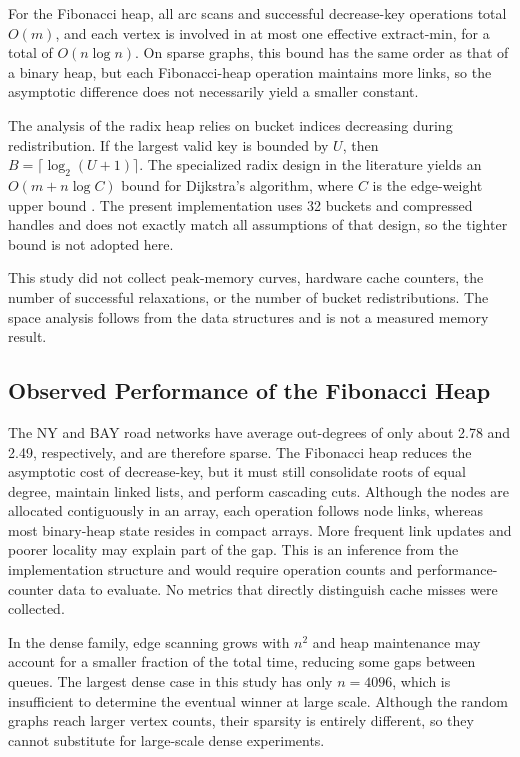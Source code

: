 For the Fibonacci heap, all arc scans and successful decrease-key operations total
$O(m)$, and each vertex is involved in at most one effective extract-min, for a
total of $O(n\log n)$. On sparse graphs, this bound has the same order as that of a
binary heap, but each Fibonacci-heap operation maintains more links, so the
asymptotic difference does not necessarily yield a smaller constant.

The analysis of the radix heap relies on bucket indices decreasing during
redistribution. If the largest valid key is bounded by $U$, then
$B=\lceil\log_2(U+1)\rceil$. The specialized radix design in the literature yields
an $O(m+n\log C)$ bound for Dijkstra's algorithm, where $C$ is the edge-weight upper
bound \cite{radix}. The present implementation uses 32 buckets and compressed
handles and does not exactly match all assumptions of that design, so the tighter
bound is not adopted here.

This study did not collect peak-memory curves, hardware cache counters, the number
of successful relaxations, or the number of bucket redistributions. The space
analysis follows from the data structures and is not a measured memory result.

\subsection{Observed Performance of the Fibonacci Heap}
The NY and BAY road networks have average out-degrees of only about 2.78 and 2.49,
respectively, and are therefore sparse. The Fibonacci heap reduces the asymptotic
cost of decrease-key, but it must still consolidate roots of equal degree, maintain
linked lists, and perform cascading cuts. Although the nodes are allocated
contiguously in an array, each operation follows node links, whereas most binary-heap
state resides in compact arrays. More frequent link updates and poorer locality may
explain part of the gap. This is an inference from the implementation structure and
would require operation counts and performance-counter data to evaluate. No metrics
that directly distinguish cache misses were collected.

In the dense family, edge scanning grows with $n^2$ and heap maintenance may account
for a smaller fraction of the total time, reducing some gaps between queues. The
largest dense case in this study has only $n=4096$, which is insufficient to determine
the eventual winner at large scale. Although the random graphs reach larger vertex
counts, their sparsity is entirely different, so they cannot substitute for
large-scale dense experiments.

